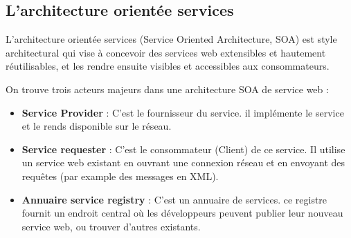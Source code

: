 \subsection{L'architecture orientée services} 
L'architecture orientée services (Service Oriented Architecture, SOA) est style architectural qui vise à concevoir des services web extensibles et hautement réutilisables, et les rendre ensuite visibles et accessibles aux consommateurs.
				
On trouve trois acteurs majeurs dans une architecture SOA de service web :
\begin{itemize}
	\item \textbf{Service Provider} : 
	      C'est le fournisseur du service. il implémente le service et le rends disponible sur le réseau.
	\item \textbf{Service requester} :
	      C'est le consommateur (Client) de ce service. Il utilise un service web existant en ouvrant une connexion réseau et en envoyant des requêtes (par example des messages en XML).
	\item \textbf{Annuaire service registry} : 
	      C'est un annuaire de services. ce registre fournit un endroit central où les développeurs peuvent publier leur nouveau service web, ou trouver d'autres existants.\newline 
\end{itemize}

